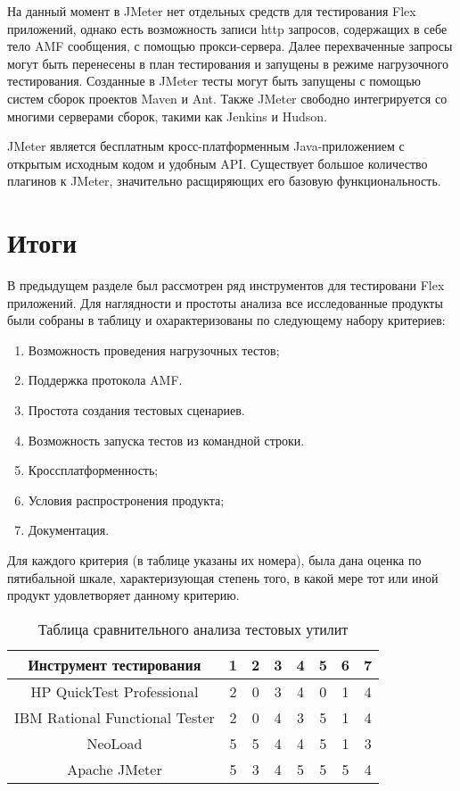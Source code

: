 На данный момент в JMeter нет отдельных средств для тестирования Flex приложений, 
однако есть возможность записи http запросов, содержащих в себе тело AMF 
сообщения, с помощью прокси-сервера. Далее перехваченные запросы могут быть 
перенесены в план тестирования и запущены в режиме нагрузочного тестирования. 
Созданные в JMeter тесты могут быть запущены с помощью систем сборок проектов Maven и 
Ant. Также JMeter свободно интегрируется со многими серверами сборок, такими как Jenkins 
и Hudson.

JMeter является бесплатным кросс-платформенным Java-приложением с открытым
исходным кодом и удобным API. Существует большое количество плагинов к JMeter, 
значительно расщиряющих его базовую функциональность.

\section{Итоги}

В предыдущем разделе был рассмотрен ряд инструментов для тестировани Flex приложений.
Для наглядности и простоты анализа все исследованные продукты были собраны в таблицу и 
охарактеризованы по следующему набору критериев:

\begin{enumerate}
\item Возможность проведения нагрузочных тестов; 
\item Поддержка протокола AMF.
\item Простота создания тестовых сценариев.
\item Возможность запуска тестов из командной строки.
\item Кроссплатформенность;
\item Условия распростронения продукта;
\item Документация.
\end{enumerate}

Для каждого критерия (в таблице указаны их номера), была дана оценка по пятибальной шкале, 
характеризующая степень того, в какой мере тот или иной продукт удовлетворяет данному критерию.

\begin{table}[ht]
\caption{Таблица сравнительного анализа тестовых утилит}
\begin{tabular}{|c|c|c|c|c|c|c|c|}
\hline 
Инструмент тестирования & 1 & 2 & 3 & 4 & 5 & 6 & 7\\
\hline 
HP QuickTest Professional & 2 & 0 & 3 & 4 & 0 & 1 & 4\\
\hline 
IBM Rational Functional Tester & 2 & 0 & 4 & 3 & 5 & 1 & 4\\
\hline 
NeoLoad & 5 & 5 & 4 & 4 & 5 & 1 & 3\\
\hline 
Apache JMeter & 5 & 3 & 4 & 5 & 5 & 5 & 4\\
\hline 
\end{tabular} 
\label{tab:tabular}
\end{table}


